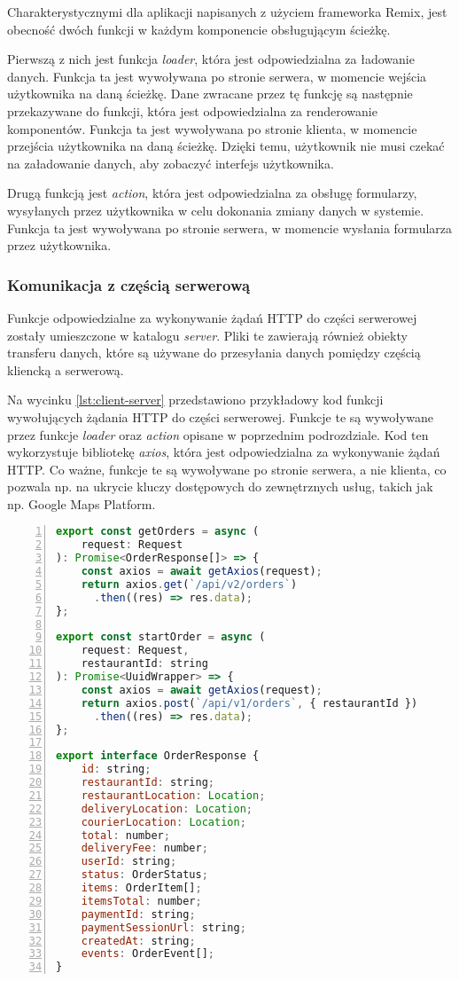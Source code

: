 Charakterystycznymi dla aplikacji napisanych z użyciem frameworka Remix, jest obecność dwóch funkcji w każdym komponencie obsługującym ścieżkę. 

Pierwszą z nich jest funkcja \textit{loader}, która jest odpowiedzialna za ładowanie danych. Funkcja ta jest wywoływana po stronie serwera, w momencie wejścia użytkownika na daną ścieżkę. Dane zwracane przez tę funkcję są następnie przekazywane do funkcji, która jest odpowiedzialna za renderowanie komponentów. Funkcja ta jest wywoływana po stronie klienta, w momencie przejścia użytkownika na daną ścieżkę. Dzięki temu, użytkownik nie musi czekać na załadowanie danych, aby zobaczyć interfejs użytkownika. 

Drugą funkcją jest \textit{action}, która jest odpowiedzialna za obsługę formularzy, wysyłanych przez użytkownika w celu dokonania zmiany danych w systemie. Funkcja ta jest wywoływana po stronie serwera, w momencie wysłania formularza przez użytkownika.

\subsubsection{Komunikacja z częścią serwerową}

Funkcje odpowiedzialne za wykonywanie żądań HTTP do części serwerowej zostały umieszczone w katalogu \textit{server}. Pliki te zawierają również obiekty transferu danych, które są używane do przesyłania danych pomiędzy częścią kliencką a serwerową.

Na wycinku \ref{lst:client-server} przedstawiono przykładowy kod funkcji wywołujących żądania HTTP do części serwerowej. Funkcje te są wywoływane przez funkcje \textit{loader} oraz \textit{action} opisane w poprzednim podrozdziale. Kod ten wykorzystuje bibliotekę \textit{axios}, która jest odpowiedzialna za wykonywanie żądań HTTP. Co ważne, funkcje te są wywoływane po stronie serwera, a nie klienta, co pozwala np. na ukrycie kluczy dostępowych do zewnętrznych usług, takich jak np. Google Maps Platform.

\begin{lstlisting}[caption={Kod funkcji wywołujących żadania HTTP do części serwerowej},label={lst:client-server},captionpos=b,language=JavaScript,numbers=left,showstringspaces=false]
export const getOrders = async (
    request: Request
): Promise<OrderResponse[]> => {
    const axios = await getAxios(request);
    return axios.get(`/api/v2/orders`)
      .then((res) => res.data);
};
  
export const startOrder = async (
    request: Request,
    restaurantId: string
): Promise<UuidWrapper> => {
    const axios = await getAxios(request);
    return axios.post(`/api/v1/orders`, { restaurantId })
      .then((res) => res.data);
};

export interface OrderResponse {
    id: string;
    restaurantId: string;
    restaurantLocation: Location;
    deliveryLocation: Location;
    courierLocation: Location;
    total: number;
    deliveryFee: number;
    userId: string;
    status: OrderStatus;
    items: OrderItem[];
    itemsTotal: number;
    paymentId: string;
    paymentSessionUrl: string;
    createdAt: string;
    events: OrderEvent[];
}
\end{lstlisting}

